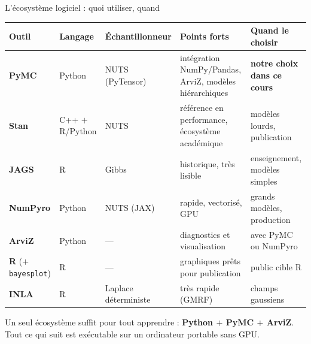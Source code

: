\begin{frame}{L'écosystème logiciel : quoi utiliser, quand}
\footnotesize
\begin{center}
\footnotesize
{\setlength{\tabcolsep}{3pt}\begin{tabular}{@{}p{1.9cm}p{2.3cm}p{2.1cm}p{2.8cm}p{2.4cm}@{}}
\toprule
\textbf{Outil} & \textbf{Langage} & \textbf{Échantillonneur} & \textbf{Points forts} & \textbf{Quand le choisir} \\
\midrule
\textbf{PyMC} & Python & NUTS (PyTensor) & intégration NumPy/Pandas, ArviZ,
modèles hiérarchiques & \textbf{notre choix dans ce cours} \\
\textbf{Stan} & C++ $+$ R/Python & NUTS & référence en performance,
écosystème académique & modèles lourds, publication \\
\textbf{JAGS} & R & Gibbs & historique, très lisible & enseignement, modèles simples \\
\textbf{NumPyro} & Python & NUTS (JAX) & rapide, vectorisé, GPU & grands modèles, production \\
\textbf{ArviZ} & Python & --- & diagnostics et visualisation & avec PyMC ou NumPyro \\
\textbf{R} ($+$ \texttt{bayesplot}) & R & --- & graphiques prêts pour publication &
public cible R \\
\textbf{INLA} & R & Laplace déterministe & très rapide (GMRF) & champs gaussiens \\
\bottomrule
\end{tabular}}
\end{center}
\vspace{1mm}
\begin{kbox}
Un seul écosystème suffit pour tout apprendre : \textbf{Python $+$ PyMC $+$ ArviZ}.
Tout ce qui suit est exécutable sur un ordinateur portable sans GPU.
\end{kbox}
\end{frame}

